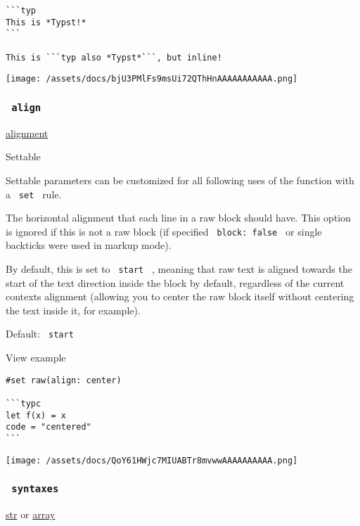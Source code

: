 \begin{verbatim}
```typ
This is *Typst!*
```

This is ```typ also *Typst*```, but inline!
\end{verbatim}

\texttt{[image: /assets/docs/bjU3PMlFs9msUi72QThHnAAAAAAAAAAA.png]}

\subsubsection{\texorpdfstring{\texttt{\ align\ }}{ align }}\label{parameters-align}

\href{/docs/reference/layout/alignment/}{alignment}

{{ Settable }}

\label{parameters-align-settable-tooltip}
Settable parameters can be customized for all following uses of the
function with a \texttt{\ set\ } rule.

The horizontal alignment that each line in a raw block should have. This
option is ignored if this is not a raw block (if specified
\texttt{\ block:\ false\ } or single backticks were used in markup
mode).

By default, this is set to \texttt{\ start\ } , meaning that raw text is
aligned towards the start of the text direction inside the block by
default, regardless of the current context\textquotesingle s alignment
(allowing you to center the raw block itself without centering the text
inside it, for example).

Default: \texttt{\ start\ }


View example

\begin{verbatim}
#set raw(align: center)

```typc
let f(x) = x
code = "centered"
```
\end{verbatim}

\texttt{[image: /assets/docs/QoY61HWjc7MIUABTr8mvwwAAAAAAAAAA.png]}

\subsubsection{\texorpdfstring{\texttt{\ syntaxes\ }}{ syntaxes }}\label{parameters-syntaxes}

\href{/docs/reference/foundations/str/}{str} {or}
\href{/docs/reference/foundations/array/}{array}

